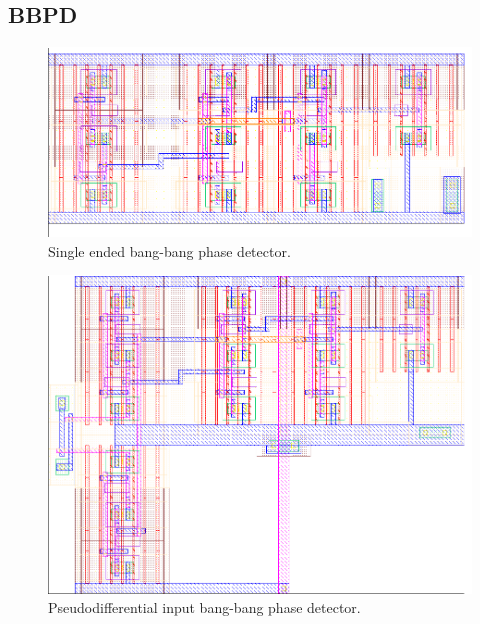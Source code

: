 		\subsection{BBPD}
			\begin{figure}[htb!]
			        \centering
			        \includegraphics[width=\textwidth, angle=0]{./figs/layout/layout_bbpd}
			    \caption{Single ended bang-bang phase detector.}
			\end{figure}
			\begin{figure}[htb!]
			        \centering
			        \includegraphics[width=\textwidth, angle=0]{./figs/layout/layout_bbpd_pseudodiff}
			    \caption{Pseudodifferential input bang-bang phase detector.}
			\end{figure}
		\FloatBarrier\pagebreak
